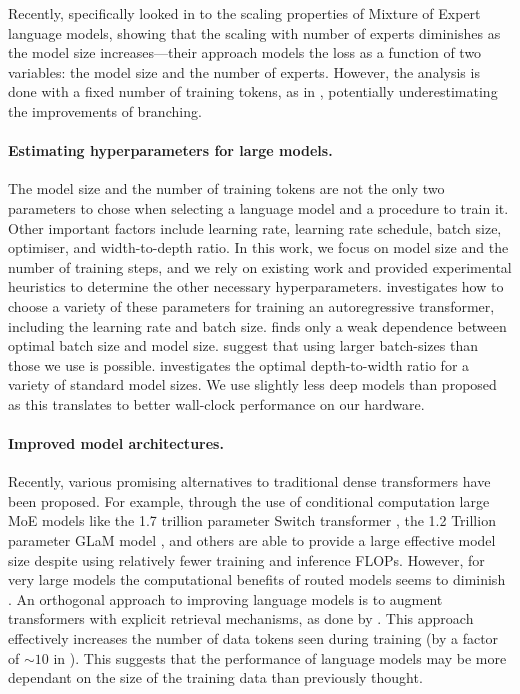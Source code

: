 \documentclass[11pt, a4paper, logo, copyright, nonumbering]{deepmind}
\begin{document}
Recently, \citet{clark2022unified} specifically looked in to the scaling properties of Mixture of Expert language models, showing that the scaling with number of experts diminishes as the model size increases---their approach models the loss as a function of two variables: the model size and the number of experts.
However, the analysis is done with a fixed number of training tokens, as in \citet{kaplan2020scaling}, potentially underestimating the improvements of branching.

\paragraph{Estimating hyperparameters for large models.}
The model size and the number of training tokens are not the only two parameters to chose when selecting a language model and a procedure to train it.
Other important factors include learning rate, learning rate schedule, batch size, optimiser, and width-to-depth ratio.
In this work, we focus on model size and the number of training steps, and we rely on existing work and provided experimental heuristics to determine the other necessary hyperparameters.
\citet{yang2021tuning} investigates how to choose a variety of these parameters for training an autoregressive transformer, including the learning rate and batch size.
\citet{mccandlish2018empirical} finds only a weak dependence between optimal batch size and model size. \citet{shallue2018measuring, NEURIPS2019_e0eacd98} suggest that using larger batch-sizes than those we use is possible.
\citet{levine2020depth} investigates the optimal depth-to-width ratio for a variety of standard model sizes. We use slightly less deep models than proposed as this translates to better wall-clock performance on our hardware. 

\paragraph{Improved model architectures.}
Recently, various promising alternatives to traditional dense transformers have been proposed.
For example, through the use of conditional computation large MoE models like the 1.7 trillion parameter Switch transformer \citep{fedus2021switch}, the 1.2 Trillion parameter GLaM model \citep{du2021glam}, and others \citep{artetxe2021efficient, zoph2022designing} are able to provide a large effective model size despite using relatively fewer training and inference FLOPs.
However, for very large models the computational benefits of routed models seems to diminish \citep{clark2022unified}.
An orthogonal approach to improving language models is to augment transformers with explicit retrieval mechanisms, as done by \citet{borgeaud2021retrieval, guu2020realm, lewisretrieval2020}. This approach effectively increases the number of data tokens seen during training (by a factor of $\sim10$ in \citet{borgeaud2021retrieval}).
This suggests that the performance of language models may be more dependant on the size of the training data than previously thought.
\end{document}
